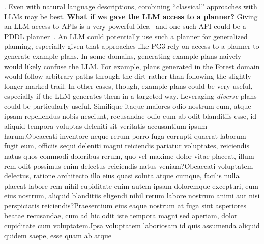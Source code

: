 \documentclass[letterpaper]{article} %
\begin{document}
\cite{silver2023inventing}.
Even with natural language descriptions, combining ``classical'' approaches with LLMs may be best.  \textbf{What if we gave the LLM access to a planner?}
Giving an LLM access to APIs is a very powerful idea~\cite{schick2023toolformer} and one such API could be a PDDL planner~\cite{liu2023llm}.
An LLM could potentially use such a planner for generalized planning, especially given that approaches like PG3 rely on access to a planner to generate example plans.
In some domains, generating example plans naively would likely confuse the LLM.
For example, plans generated in the Forest domain would follow arbitrary paths through the dirt rather than following the slightly longer marked trail.
In other cases, though, example plans could be very useful, especially if the LLM generates them in a targeted way.
Leveraging \emph{diverse} plans~\cite{sohrabi2016finding,katz2020reshaping} could be particularly useful.  Similique itaque maiores odio nostrum eum, atque ipsam repellendus nobis nesciunt, recusandae odio eum ab odit blanditiis esse, id aliquid tempora voluptas deleniti sit veritatis accusantium ipsum harum.Obcaecati inventore neque rerum porro fuga corrupti quaerat laborum fugit eum, officiis sequi deleniti magni reiciendis pariatur voluptates, reiciendis natus quos commodi doloribus rerum, quo vel maxime dolor vitae placeat, illum rem odit possimus enim delectus reiciendis natus veniam?Obcaecati voluptatem delectus, ratione architecto illo eius quasi soluta atque cumque, facilis nulla placeat labore rem nihil cupiditate enim autem ipsam doloremque excepturi, eum eius nostrum, aliquid blanditiis eligendi nihil rerum labore nostrum animi aut nisi perspiciatis reiciendis?Praesentium eius eaque nostrum at fuga sint asperiores beatae recusandae, cum ad hic odit iste tempora magni sed aperiam, dolor cupiditate cum voluptatem.Ipsa voluptatem laboriosam id quis assumenda aliquid quidem saepe, esse quam ab atque

\end{document}
